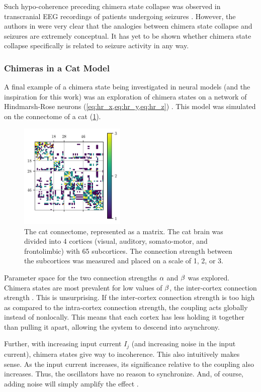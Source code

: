 Such hypo-coherence preceding chimera state collapse was observed in transcranial EEG recordings of patients undergoing seizures \cite{Andrzejak2016}.
However, the authors in \cite{Andrzejak2016} were very clear that the analogies between chimera state collapse and seizures are extremely conceptual.
It has yet to be shown whether chimera state collapse specifically is related to seizure activity in any way.

\subsubsection{Chimeras in a Cat Model}
\label{sec:lit_review_chimera_cat}
A final example of a chimera state being investigated in neural models (and the inspiration for this work) was an exploration of chimera states on a network of Hindmarsh-Rose neurons (\cref{eq:hr_x,eq:hr_y,eq:hr_z}) \cite{Santos2017}.
This model was simulated on the connectome of a cat (\cref{fig:cat_matrix}).
\begin{figure}[ht]
  \centering
  \includegraphics[width=0.45\textwidth]{figure/cat_matrix.pdf}
  \caption[Cat connectome]{The cat connectome, represented as a matrix.
    The cat brain was divided into 4 cortices (visual, auditory, somato-motor, and frontolimbic) with 65 subcortices.
    The connection strength between the subcortices was measured and placed on a scale of 1, 2, or 3.
  }
  \label{fig:cat_matrix}
\end{figure}
Parameter space for the two connection strengths $\alpha$ and $\beta$ was explored.
Chimera states are most prevalent for low values of $\beta$, the inter-cortex connection strength \cite{Santos2017}.
This is unsurprising.
If the inter-cortex connection strength is too high as compared to the intra-cortex connection strength, the coupling acts globally instead of nonlocally.
This means that each cortex has less holding it together than pulling it apart, allowing the system to descend into asynchrony.

Further, with increasing input current $I_{j}$ (and increasing noise in the input current), chimera states give way to incoherence.
This also intuitively makes sense.
As the input current increases, its significance relative to the coupling also increases.
Thus, the oscillators have no reason to synchronize.
And, of course, adding noise will simply amplify the effect \cite{Santos2017}.

